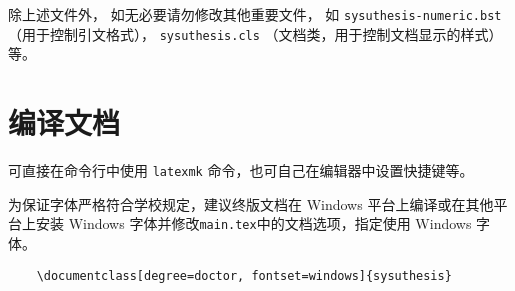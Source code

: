 除上述文件外，
如无必要请勿修改其他重要文件，
如 \verb|sysuthesis-numeric.bst|（用于控制引文格式），
\verb|sysuthesis.cls| （文档类，用于控制文档显示的样式）等。

\section{编译文档}

可直接在命令行中使用 \texttt{latexmk} 命令，也可自己在编辑器中设置快捷键等。

为保证字体严格符合学校规定，建议终版文档在 Windows 平台上编译或在其他平台上安装 Windows 字体并修改\texttt{main.tex}中的文档选项，指定使用 Windows 字体。
\begin{verbatim}
    \documentclass[degree=doctor, fontset=windows]{sysuthesis}
\end{verbatim}